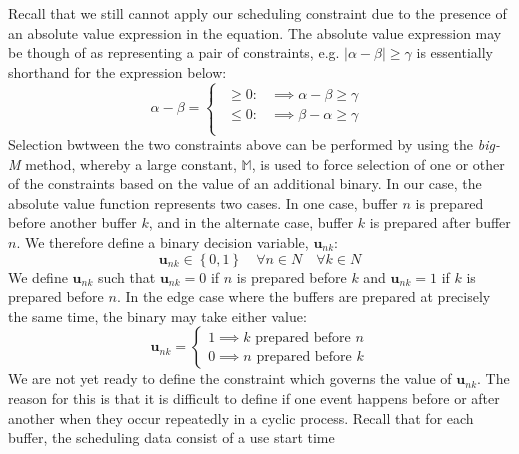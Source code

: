 Recall that we still cannot apply our scheduling constraint due to the presence
of an absolute value expression in the equation.
The absolute value expression may be though of as representing a pair of
constraints, e.g. $ \lvert \alpha - \beta \rvert \ge \gamma $ is essentially 
shorthand for the expression below:
\begin{equation}
    \alpha - \beta = 
    \begin{cases}
        \begin{alignedat}{2}
            \ge 0: &\implies \alpha - \beta \ge \gamma\\
            \le 0: &\implies \beta - \alpha \ge \gamma\\
        \end{alignedat}
    \end{cases}
\end{equation}
Selection bwtween the two constraints above can be performed by using the 
\emph{big-M} method, whereby a large constant, $ \mathbb{M} $, is used to force
selection of one or other of the constraints
based on the value of an additional binary.
In our case, the absolute value function represents two cases.
In one case, buffer $n$ is prepared before another buffer $k$, and in the
alternate case, buffer $k$ is prepared after buffer $n$.
We therefore define a binary decision variable, $\boldsymbol{u}_{nk}$:
\begin{equation}
    \boldsymbol{u}_{nk} \in \left\{ 0, 1 \right\} \quad \forall n \in N \quad
    \forall k \in N
    \label{eq.u}
\end{equation}
We define $\boldsymbol{u}_{nk}$ such that $ \boldsymbol{u}_{nk} = 0 $ if $n$ is
prepared before $k$ and $ \boldsymbol{u}_{nk} = 1 $ if $k$ is prepared before
$n$.
In the edge case where the buffers are prepared at precisely the same time,
the binary may take either value:
\begin{equation}
    \boldsymbol{u}_{nk} =
    \begin{cases}
        1 \implies k \text{ prepared before } n\\
        0 \implies n \text{ prepared before } k
    \end{cases}
\end{equation}
We are not yet ready to define the constraint which governs the value of
$\boldsymbol{u}_{nk}$.
The reason for this is that it is difficult to define if one event happens
before or after another when they occur repeatedly in a cyclic process.
Recall that for each buffer, the scheduling data consist of a use start time
